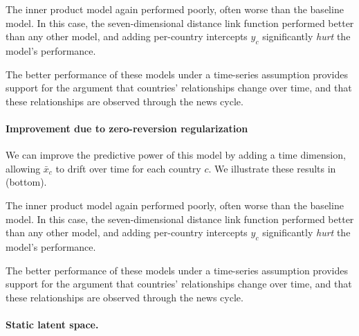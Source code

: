 The inner product model again performed poorly, often worse than the
baseline model.  In this case, the seven-dimensional distance link
function performed better than any other model, and adding per-country
intercepts $y_c$ significantly \emph{hurt} the model's performance.

The better performance of these models under a time-series assumption
provides support for the argument that countries' relationships change
over time, and that these relationships are observed through the news
cycle.

\paragraph{Improvement due to zero-reversion regularization}
We can improve the predictive power of this model by adding a time
dimension, allowing $\bar x_c$ to drift over time for each country
$c$.  We illustrate these results in (bottom).

The inner product model again performed poorly, often worse than the
baseline model.  In this case, the seven-dimensional distance link
function performed better than any other model, and adding per-country
intercepts $y_c$ significantly \emph{hurt} the model's performance.

The better performance of these models under a time-series assumption
provides support for the argument that countries' relationships change
over time, and that these relationships are observed through the news
cycle.

\paragraph{Static latent space.}


